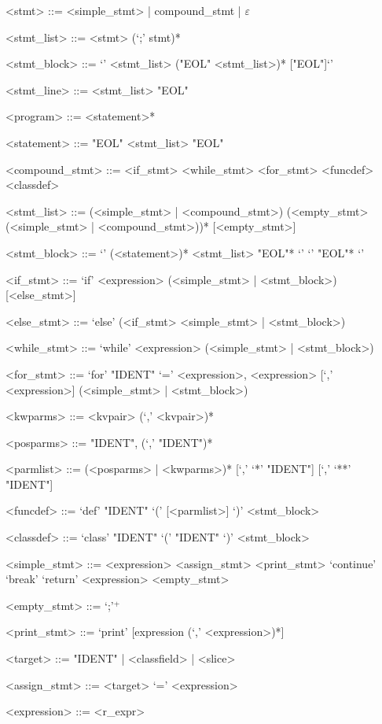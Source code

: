 \documentclass[10pt,a4paper]{article}
\begin{document}
\begin{grammar}


<stmt> ::= <simple_stmt> | compound_stmt | $\varepsilon$

<stmt_list> ::= <stmt> (`;' stmt)*

<stmt_block> ::= `{' <stmt_list> ("EOL" <stmt_list>)* ["EOL"]`}'

<stmt_line> ::= <stmt_list> "EOL"


<program> ::= <statement>*

<statement> ::= "EOL"
	\alt <stmt_list> "EOL"

<compound_stmt> ::= <if_stmt>
	\alt <while_stmt>
	\alt <for_stmt>
	\alt <funcdef>
    \alt <classdef>
	
<stmt_list> ::= (<simple_stmt> | <compound_stmt>) (<empty_stmt> (<simple_stmt> | <compound_stmt>))* [<empty_stmt>]

<stmt_block> ::= `{' (<statement>)* <stmt_list> "EOL"* `}' 
                    \alt `{' "EOL"* `}'

<if_stmt> ::= `if' <expression> (<simple_stmt> | <stmt_block>) [<else_stmt>]

<else_stmt> ::= `else' (<if_stmt> \alt <simple_stmt> | <stmt_block>)
              
<while_stmt> ::= `while' <expression> (<simple_stmt> | <stmt_block>)

<for_stmt> ::= `for' "IDENT" `=' <expression>, <expression> [`,' <expression>] (<simple_stmt> | <stmt_block>)

<kwparms> ::= <kvpair> (`,' <kvpair>)*

<posparms> ::= "IDENT", (`,' "IDENT")*

<parmlist> ::= (<posparms> | <kwparms>)* [`,' `*' "IDENT"] [`,' `**' "IDENT"]

<funcdef> ::= `def' "IDENT" `(' [<parmlist>] `)' <stmt_block>

<classdef> ::= `class' "IDENT" `(' "IDENT" `)' <stmt_block>

<simple_stmt> ::= <expression>
	\alt <assign_stmt>                    
	\alt <print_stmt>
	\alt `continue'
	\alt `break'
	\alt `return' <expression>
	\alt <empty_stmt>
	
<empty_stmt> ::= `;'$^{+}$

<print_stmt> ::= `print' [expression (`,' <expression>)*]

<target> ::= "IDENT" | <classfield> | <slice>

<assign_stmt> ::= <target> `=' <expression>

<expression> ::= <r_expr>


\end{grammar}
\end{document}
